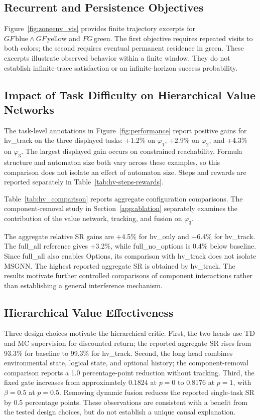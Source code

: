 \documentclass[journal]{IEEEtran}
\begin{document}
\subsection{Recurrent and Persistence Objectives}

Figure~\ref{fig:zoneenv_vis} provides finite trajectory excerpts for $GF\,\mathrm{blue}\land GF\,\mathrm{yellow}$ and $FG\,\mathrm{green}$. The first objective requires repeated visits to both colors; the second requires eventual permanent residence in green. These excerpts illustrate observed behavior within a finite window. They do not establish infinite-trace satisfaction or an infinite-horizon success probability.

\subsection{Impact of Task Difficulty on Hierarchical Value Networks}

The task-level annotations in Figure~\ref{fig:performance} report positive gains for hv\_track on the three displayed tasks: +1.2\% on $\varphi_1$, +2.9\% on $\varphi_2$, and +4.3\% on $\varphi_3$. The largest displayed gain occurs on constrained reachability. Formula structure and automaton size both vary across these examples, so this comparison does not isolate an effect of automaton size. Steps and rewards are reported separately in Table~\ref{tab:hv-steps-rewards}.

Table~\ref{tab:hv_comparison} reports aggregate configuration comparisons. The component-removal study in Section~\ref{app:ablation} separately examines the contribution of the value network, tracking, and fusion on $\varphi_3$.



The aggregate relative SR gains are +4.5\% for hv\_only and +6.4\% for hv\_track. The full\_all reference gives +3.2\%, while full\_no\_options is 0.4\% below baseline. Since full\_all also enables Options, its comparison with hv\_track does not isolate MSGNN. The highest reported aggregate SR is obtained by hv\_track. The results motivate further controlled comparisons of component interactions rather than establishing a general interference mechanism.

\subsection{Hierarchical Value Effectiveness}

Three design choices motivate the hierarchical critic. First, the two heads use TD and MC supervision for discounted return; the reported aggregate SR rises from 93.3\% for baseline to 99.3\% for hv\_track. Second, the long head combines environmental state, logical state, and optional history; the component-removal comparison reports a 1.0 percentage-point reduction without tracking. Third, the fixed gate increases from approximately 0.1824 at $p=0$ to 0.8176 at $p=1$, with $\beta=0.5$ at $p=0.5$. Removing dynamic fusion reduces the reported single-task SR by 0.5 percentage points. These observations are consistent with a benefit from the tested design choices, but do not establish a unique causal explanation.
\end{document}
